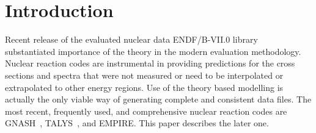 \maketitle
\tableofcontents





\vspace*{12mm} 
  \lfoot{} \rfoot{} %
\setlength{\headrulewidth}{0.4pt} \setlength{\footrulewidth}{0.4pt}

%

\newpage

\section{Introduction}

Recent release of the evaluated nuclear data ENDF/B-VII.0 library~\cite%
{ENDF-VII} substantiated importance of the theory in the modern evaluation
methodology. Nuclear reaction codes are instrumental in providing
predictions for the cross sections and spectra that were not measured or
need to be interpolated or extrapolated to other energy regions. Use of the
theory based modelling is actually the only viable way of generating
complete and consistent data files. The most recent, frequently used, and
comprehensive nuclear reaction codes are GNASH~\cite{Young:77, Young:92,
Young:98}, TALYS~\cite{TALYS}, and EMPIRE. This paper describes the later
one.

